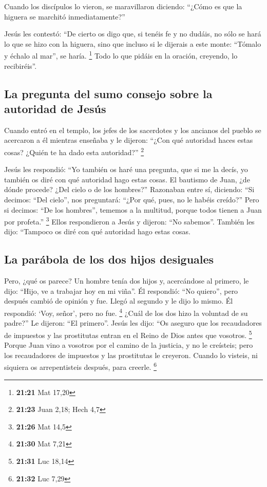  Cuando los discípulos lo vieron, se maravillaron
diciendo: ``¿Cómo es que la higuera se marchitó inmediatamente?''

 Jesús les contestó: ``De cierto os digo que, si tenéis
fe y no dudáis, no sólo se hará lo que se hizo con la higuera, sino que
incluso si le dijerais a este monte: ``Tómalo y échalo al mar'', se
haría. \footnote{\textbf{21:21} Mat 17,20}  Todo lo que
pidáis en la oración, creyendo, lo recibiréis''.

\hypertarget{la-pregunta-del-sumo-consejo-sobre-la-autoridad-de-jesuxfas}{%
\subsection{La pregunta del sumo consejo sobre la autoridad de
Jesús}\label{la-pregunta-del-sumo-consejo-sobre-la-autoridad-de-jesuxfas}}

 Cuando entró en el templo, los jefes de los sacerdotes y
los ancianos del pueblo se acercaron a él mientras enseñaba y le
dijeron: ``¿Con qué autoridad haces estas cosas? ¿Quién te ha dado esta
autoridad?'' \footnote{\textbf{21:23} Juan 2,18; Hech 4,7}

 Jesús les respondió: ``Yo también os haré una pregunta,
que si me la decís, yo también os diré con qué autoridad hago estas
cosas.  El bautismo de Juan, ¿de dónde procede? ¿Del
cielo o de los hombres?'' Razonaban entre sí, diciendo: ``Si decimos:
``Del cielo'', nos preguntará: ``¿Por qué, pues, no le habéis creído?''
 Pero si decimos: ``De los hombres'', tememos a la
multitud, porque todos tienen a Juan por profeta.'' \footnote{\textbf{21:26}
  Mat 14,5}  Ellos respondieron a Jesús y dijeron: ``No
sabemos''. También les dijo: ``Tampoco os diré con qué autoridad hago
estas cosas.

\hypertarget{la-paruxe1bola-de-los-dos-hijos-desiguales}{%
\subsection{La parábola de los dos hijos
desiguales}\label{la-paruxe1bola-de-los-dos-hijos-desiguales}}

 Pero, ¿qué os parece? Un hombre tenía dos hijos y,
acercándose al primero, le dijo: ``Hijo, ve a trabajar hoy en mi viña''.
 Él respondió: ``No quiero'', pero después cambió de
opinión y fue.  Llegó al segundo y le dijo lo mismo. Él
respondió: `Voy, señor', pero no fue. \footnote{\textbf{21:30} Mat 7,21}
 ¿Cuál de los dos hizo la voluntad de su padre?'' Le
dijeron: ``El primero''. Jesús les dijo: ``Os aseguro que los
recaudadores de impuestos y las prostitutas entran en el Reino de Dios
antes que vosotros. \footnote{\textbf{21:31} Luc 18,14} 
Porque Juan vino a vosotros por el camino de la justicia, y no le
creísteis; pero los recaudadores de impuestos y las prostitutas le
creyeron. Cuando lo visteis, ni siquiera os arrepentisteis después, para
creerle. \footnote{\textbf{21:32} Luc 7,29}

